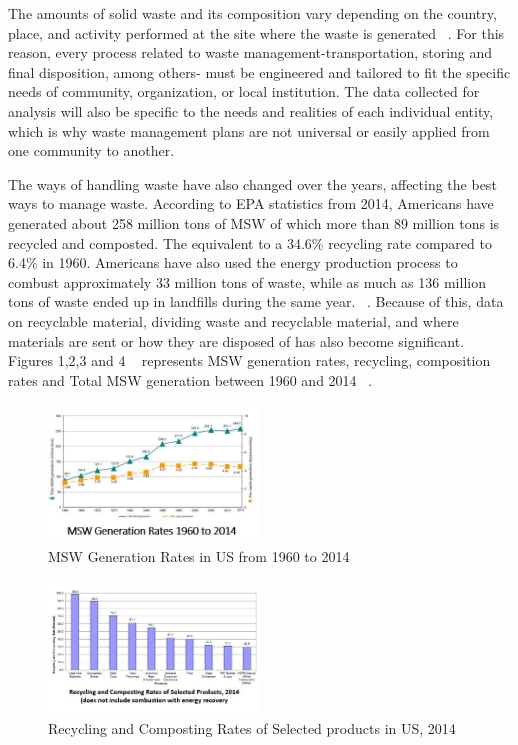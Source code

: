 \documentclass[sigconf]{acmart}
\begin{document}
The amounts of solid waste and its composition vary depending on the country, place, and activity performed at the site where the waste is generated ~\cite{chandrappa2012}. For this reason, every process related to waste management-transportation, storing and final disposition, among others- must be engineered and tailored to fit the specific needs of community, organization, or local institution.  The data collected for analysis will also be specific to the needs and realities of each individual entity, which is why waste management plans are not universal or easily applied from one community to another.  

The ways of handling waste have also changed over the years, affecting the best ways to manage waste. According to EPA statistics from 2014, Americans have generated about 258 million tons of MSW of which more than 89 million tons is recycled and composted. The equivalent to a 34.6\% recycling rate compared to 6.4\% in 1960. Americans have also used the energy production process to combust approximately 33 million tons of waste,  while as much as 136 million tons of waste ended up in landfills during the same year. ~\cite{epa2014}.  Because of this, data on recyclable material, dividing waste and recyclable material, and where materials are sent or how they are disposed of has also become significant. Figures 1,2,3 and 4 ~\cite{epa2014} represents MSW generation rates, recycling, composition rates and Total MSW generation between 1960 and 2014 ~\cite{epa2014}.

\begin{figure}[ht!]
  \includegraphics[width=0.5\textwidth]{fig1.png}
  \caption{MSW Generation Rates in US from 1960 to 2014}
\end{figure}

\begin{figure}[ht!]
 \includegraphics[width=0.5\textwidth]{fig2.png}
 \caption{Recycling and Composting Rates of Selected products in US, 2014}
\end{figure}
\end{document}
